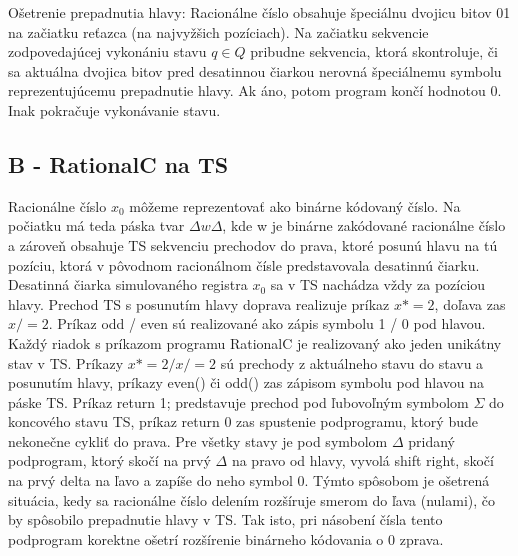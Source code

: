 \documentclass[10pt]{article}
\begin{document}
        Ošetrenie prepadnutia hlavy:
        Racionálne číslo obsahuje špeciálnu dvojicu bitov 01 na začiatku reťazca (na najvyžšich
        pozíciach). Na začiatku sekvencie zodpovedajúcej vykonániu stavu $q \in Q$ pribudne
        sekvencia, ktorá skontroluje, či sa aktuálna dvojica bitov pred desatinnou čiarkou nerovná
        špeciálnemu symbolu reprezentujúcemu prepadnutie hlavy. Ak áno, potom program končí hodnotou
        0. Inak pokračuje vykonávanie stavu.


\subsection*{B - RationalC na TS}
Racionálne číslo $x_0$ môžeme reprezentovať ako binárne kódovaný číslo. Na počiatku má teda páska
tvar $\Delta w \Delta$, kde w je binárne zakódované racionálne číslo a zároveň obsahuje TS sekvenciu
prechodov do prava, ktoré posunú hlavu na tú pozíciu, ktorá v pôvodnom racionálnom čísle
predstavovala desatinnú čiarku. Desatinná čiarka simulovaného registra $x_0$ sa v TS nachádza vždy
za pozíciou hlavy.
Prechod TS s posunutím hlavy doprava realizuje príkaz $x *= 2$, doľava zas $x /= 2$. Príkaz odd /
even sú realizované ako zápis symbolu 1 / 0 pod hlavou.
Každý riadok s príkazom programu RationalC je realizovaný ako jeden unikátny stav v TS.
Príkazy $x *= 2 / x /= 2$ sú prechody z aktuálneho stavu do stavu a posunutím hlavy,
príkazy even() či odd() zas zápisom symbolu pod hlavou na páske TS.
Príkaz return 1; predstavuje prechod pod ľubovoľným symbolom $\Sigma$ do koncového stavu TS,
príkaz return 0 zas spustenie podprogramu, ktorý bude nekonečne cykliť do prava.
Pre všetky stavy je pod symbolom $\Delta$ pridaný podprogram, ktorý skočí na prvý $\Delta$ na pravo od
hlavy, vyvolá shift right, skočí na prvý delta na ľavo a zapíše do neho symbol 0.
Týmto spôsobom je ošetrená situácia, kedy sa racionálne číslo delením rozšíruje smerom do ľava
(nulami), čo by spôsobilo prepadnutie hlavy v TS. 
Tak isto, pri násobení čísla tento podprogram korektne ošetrí rozšírenie binárneho kódovania o 0
zprava.
\end{document}
